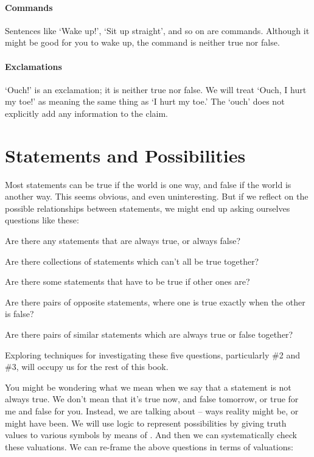 \documentclass[PHIL101-Textbook.tex]{subfiles}
\begin{document}
\paragraph{Commands} Sentences like `Wake up!', `Sit up straight', and so on are commands. Although it might be good for you to wake up, the command is neither true nor false.

\paragraph{Exclamations} `Ouch!' is an exclamation; it is neither true nor false. We will treat `Ouch, I hurt my toe!' as meaning the same thing as `I hurt my toe.' The `ouch' does not explicitly add any information to the claim. 



\section{Statements and Possibilities}

Most statements can be true if the world is one way, and false if the world is another way. This seems obvious, and even uninteresting. But if we reflect on the possible relationships between statements, we might end up asking ourselves questions like these:

\begin{earg}
\item Are there any statements that are always true, or always false?
\item Are there collections of statements which can't all be true together?
\item Are there some statements that have to be true if other ones are?
\item Are there pairs of opposite statements, where one is true exactly when the other is false?
\item Are there pairs of similar statements which are always true or false together?
\end{earg}

Exploring techniques for investigating these five questions, particularly \#2 and \#3, will occupy us for the rest of this book. 


You might be wondering what we mean when we say that a statement is not always true.  We don't mean that it's true now, and false tomorrow, or true for me and false for you. Instead, we are talking about  -- ways reality might be, or might have been. We will use logic to represent possibilities by giving truth values to various symbols by means of . And then we can systematically check these valuations. We can re-frame the above questions in terms of valuations:
\end{document}

